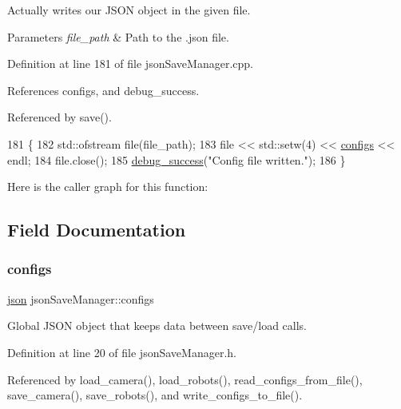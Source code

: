 Actually writes our J\+S\+ON object in the given file. 


\begin{DoxyParams}{Parameters}
{\em file\+\_\+path} & Path to the .json file. \\
\hline
\end{DoxyParams}


Definition at line 181 of file json\+Save\+Manager.\+cpp.



References configs, and debug\+\_\+success.



Referenced by save().


\begin{DoxyCode}
181                                                             \{
182     std::ofstream file(file\_path);
183     file << std::setw(4) << \hyperlink{classjson_save_manager_acfbca58deba9ed712131c20a8f965dfd}{configs} << endl;
184     file.close();
185     \hyperlink{debug_8hpp_aab16d4de33d0ed49f629781df5b8429a}{debug\_success}(\textcolor{stringliteral}{"Config file written."});
186 \}
\end{DoxyCode}
Here is the caller graph for this function\+:


\subsection{Field Documentation}
\mbox{\label{classjson_save_manager_acfbca58deba9ed712131c20a8f965dfd}} 
\subsubsection{\texorpdfstring{configs}{configs}}
{\footnotesize\ttfamily \hyperlink{json_save_manager_8h_ab701e3ac61a85b337ec5c1abaad6742d}{json} json\+Save\+Manager\+::configs\hspace{0.3cm}{\ttfamily [private]}}



Global J\+S\+ON object that keeps data between save/load calls. 



Definition at line 20 of file json\+Save\+Manager.\+h.



Referenced by load\+\_\+camera(), load\+\_\+robots(), read\+\_\+configs\+\_\+from\+\_\+file(), save\+\_\+camera(), save\+\_\+robots(), and write\+\_\+configs\+\_\+to\+\_\+file().


